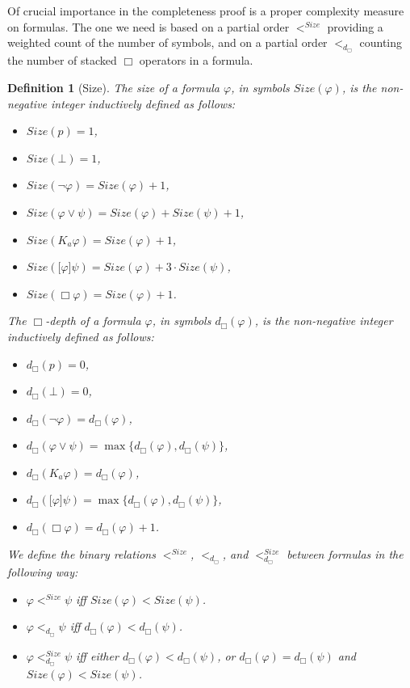 \documentclass{article}[12pt]
\newtheorem{definition}{Definition}
\renewcommand{\phi}{\varphi}
\begin{document}
Of crucial importance in the completeness proof is a proper complexity measure on formulas. The one we need is based on a partial order $<^{Size}$ providing a weighted count of the number of symbols, and on a partial order $<_{d_\Box}$ counting the number of stacked $\Box$ operators in a formula.

\begin{definition}[Size]
The size of a formula $\phi$, in symbols $Size(\phi)$, is the non-negative integer inductively defined as follows:
\begin{itemize}
\item $Size(p)=1$,
\item $Size(\bot)=1$,
\item $Size(\neg\phi)=Size(\phi)+1$,
\item $Size(\phi\vee\psi)=Size(\phi)+Size(\psi)+1$,
\item $Size(K_{a}\phi)=Size(\phi)+1$,
\item $Size(\lbrack\phi\rbrack\psi)=Size(\phi)+3 \cdot Size(\psi)$,
\item $Size(\Box\phi)=Size(\phi)+1$.
\end{itemize}
The $\Box$-depth of a formula $\phi$, in symbols $d_{\Box}(\phi)$, is the non-negative integer inductively defined as follows:
\begin{itemize}
\item $d_{\Box}(p)=0$,
\item $d_{\Box}(\bot)=0$,
\item $d_{\Box}(\neg\phi)=d_{\Box}(\phi)$,
\item $d_{\Box}(\phi\vee\psi)=\max\{d_{\Box}(\phi),d_{\Box}(\psi)\}$,
\item $d_{\Box}(K_{a}\phi)=d_{\Box}(\phi)$,
\item $d_{\Box}(\lbrack\phi\rbrack\psi)=\max\{d_{\Box}(\phi),d_{\Box}(\psi)\}$,
\item $d_{\Box}(\Box\phi)=d_{\Box}(\phi)+1$.
\end{itemize}
We define the binary relations $<^{Size}$,  $<_{d_{\Box}}$, and $<_{d_{\Box}}^{Size}$ between formulas in the following way:
\begin{itemize}
\item $\phi<^{Size}\psi$ iff $Size(\phi)<Size(\psi)$.
\item $\phi<_{d_{\Box}}\psi$ iff $d_{\Box}(\phi)<d_{\Box}(\psi)$.
\item $\phi<_{d_{\Box}}^{Size}\psi$ iff either $d_{\Box}(\phi)<d_{\Box}(\psi)$, or $d_{\Box}(\phi)=d_{\Box}(\psi)$ and $Size(\phi)<Size(\psi)$.
\end{itemize}

\end{definition}
\end{document}
